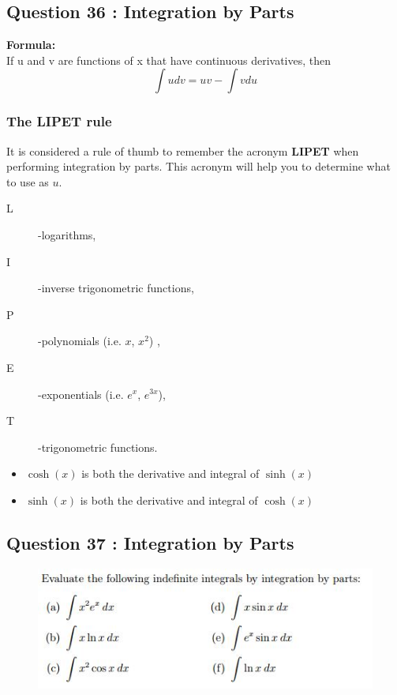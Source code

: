 \documentclass[]{article}
\begin{document}







\subsection*{Question 36 : Integration by Parts}
\begin{framed}
\noindent	\textbf{Formula:} \\ If u and v are functions of x that have continuous derivatives,
	then
	\[\int udv = uv - \int vdu\]
\end{framed}
\newpage
\subsubsection*{The LIPET rule}
It is considered a rule of thumb to remember the acronym \textbf{LIPET}
when performing integration by parts. This acronym will help you to determine
what to use as $u$. 


\begin{description}
	\item[L]-logarithms, 
	\item[I]-inverse trigonometric functions,
	\item[P]-polynomials (i.e. $x$, $x^2$) , 
	\item[E]-exponentials (i.e. $e^x$, $e^{3x}$), 
	\item[T]-trigonometric functions.
\end{description}

\begin{framed}
	\begin{itemize}
		\item
		$\cosh(x)$ is both the derivative and integral of $\sinh(x)$
		
		\item
		$\sinh(x)$ is both the derivative and integral of $\cosh(x)$
	\end{itemize}
\end{framed}
\subsection*{Question 37 : Integration by Parts}
\begin{figure}[h!]
	\centering
	\includegraphics[width=0.7\linewidth]{Question26integrationbyparts}
\end{figure}
\end{document}
